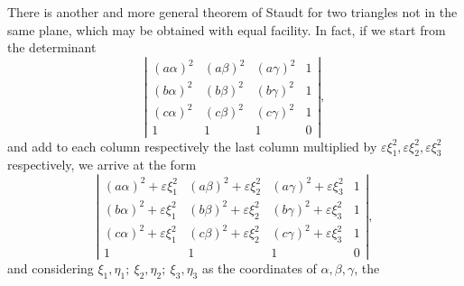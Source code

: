 \documentclass[11pt]{article}
\begin{document}
{{There is another and more general theorem of Staudt for two triangles not in the same plane, which may be obtained with equal facility. In fact, if we start from the determinant
\[
\left|\begin{array}{cccc}
(a\alpha)^2&(a\beta)^2&(a\gamma)^2&1\\
(b\alpha)^2&(b\beta)^2&(b\gamma)^2&1\\
(c\alpha)^2&(c\beta)^2&(c\gamma)^2&1\\
1&1&1&0
\end{array}\right|,
\]
and add to each column respectively the last column multiplied by $\varepsilon \xi_1^2,\varepsilon\xi_2^2,\varepsilon\xi_3^2$ respectively, we arrive at the form
\[
\left|\begin{array}{cccc}
(a\alpha)^2+\varepsilon\xi_1^2&(a\beta)^2+\varepsilon\xi_2^2&(a\gamma)^2+\varepsilon\xi_3^2&1\\
(b\alpha)^2+\varepsilon\xi_1^2&(b\beta)^2+\varepsilon\xi_2^2&(b\gamma)^2+\varepsilon\xi_3^2&1\\
(c\alpha)^2+\varepsilon\xi_1^2&(c\beta)^2+\varepsilon\xi_2^2&(c\gamma)^2+\varepsilon\xi_3^2&1\\
1&1&1&0
\end{array}\right|,
\]
and considering $\xi_1,\eta_1;\ \xi_2,\eta_2;\ \xi_3,\eta_3$ as the coordinates of $\alpha,\beta,\gamma$, the

}}
\end{document}
